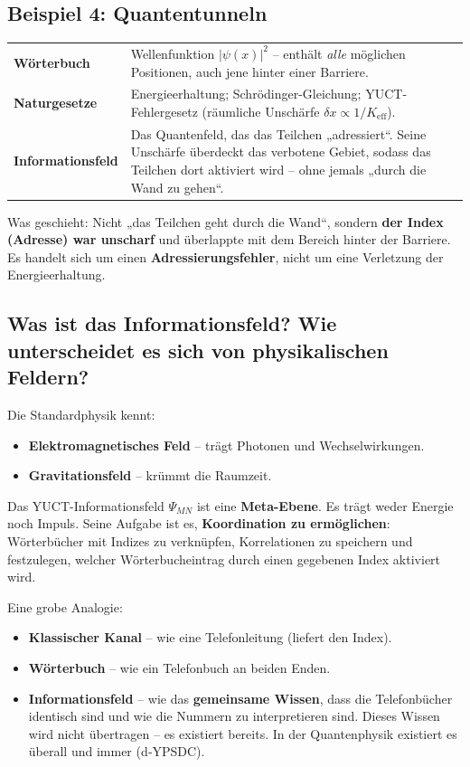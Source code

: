 \documentclass[12pt,a4paper]{article}
\begin{document}
	\subsection{Beispiel 4: Quantentunneln}
	\begin{tabular}{p{2.8cm} p{10cm}}
		\textbf{Wörterbuch} & Wellenfunktion \(|\psi(x)|^2\) – enthält \emph{alle} möglichen Positionen, auch jene hinter einer Barriere. \\
		\textbf{Naturgesetze} & Energieerhaltung; Schrödinger-Gleichung; YUCT-Fehlergesetz (räumliche Unschärfe \(\delta x \propto 1/K_{\mathrm{eff}}\)). \\
		\textbf{Informationsfeld} & Das Quantenfeld, das das Teilchen „adressiert“. Seine Unschärfe überdeckt das verbotene Gebiet, sodass das Teilchen dort aktiviert wird – ohne jemals „durch die Wand zu gehen“. \\
	\end{tabular}
	
	\noindent Was geschieht: Nicht „das Teilchen geht durch die Wand“, sondern \textbf{der Index (Adresse) war unscharf} und überlappte mit dem Bereich hinter der Barriere. Es handelt sich um einen \textbf{Adressierungsfehler}, nicht um eine Verletzung der Energieerhaltung.
	
	\subsection{Was ist das Informationsfeld? Wie unterscheidet es sich von physikalischen Feldern?}
	Die Standardphysik kennt:
	\begin{itemize}
		\item \textbf{Elektromagnetisches Feld} – trägt Photonen und Wechselwirkungen.
		\item \textbf{Gravitationsfeld} – krümmt die Raumzeit.
	\end{itemize}
	Das YUCT-Informationsfeld \(\Psi_{MN}\) ist eine \textbf{Meta-Ebene}. Es trägt weder Energie noch Impuls. Seine Aufgabe ist es, \textbf{Koordination zu ermöglichen}: Wörterbücher mit Indizes zu verknüpfen, Korrelationen zu speichern und festzulegen, welcher Wörterbucheintrag durch einen gegebenen Index aktiviert wird.
	
	Eine grobe Analogie:
	\begin{itemize}
		\item \textbf{Klassischer Kanal} – wie eine Telefonleitung (liefert den Index).
		\item \textbf{Wörterbuch} – wie ein Telefonbuch an beiden Enden.
		\item \textbf{Informationsfeld} – wie das \textbf{gemeinsame Wissen}, dass die Telefonbücher identisch sind und wie die Nummern zu interpretieren sind. Dieses Wissen wird nicht übertragen – es existiert bereits. In der Quantenphysik existiert es überall und immer (d‑YPSDC).
	\end{itemize}
	
\end{document}
